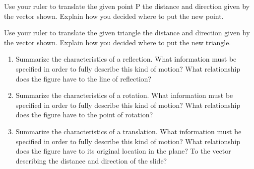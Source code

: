 \documentclass[nooutcomes]{ximera}
\begin{document}
\begin{problem}
Use your ruler to translate the given point P the distance and direction given by the vector shown.  Explain how you decided where to put the new point.\\
\vskip 1.5in


\begin{center}
\end{center}
\vfill
\end{problem}
\newpage

\begin{problem}
Use your ruler to translate the given triangle the distance and direction given by the vector shown.  Explain how you decided where to put the new triangle.\\
\vskip 1.5in
\begin{center}
\end{center}
\vfill
\end{problem}
\newpage

\begin{problem}
\begin{enumerate}
    \item Summarize the characteristics of a reflection.  What information must be specified in order to fully describe this kind of motion?  What relationship does the figure have to the line of reflection?
    \item Summarize the characteristics of a rotation.  What information must be specified in order to fully describe this kind of motion?  What relationship does the figure have to the point of rotation?
    \item Summarize the characteristics of a translation.  What information must be specified in order to fully describe this kind of motion?  What relationship does the figure have to its original location in the plane? To the vector describing the distance and direction of the slide?
\end{enumerate}


\end{problem}
\end{document}
